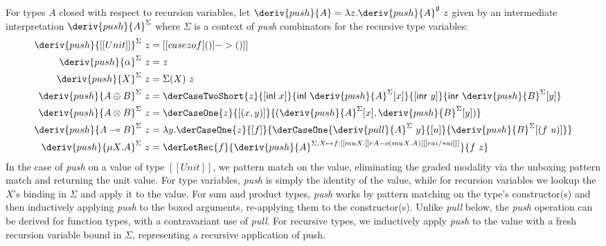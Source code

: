 For types $A$ closed with respect to recursion variables, let $\deriv{push}{A} = \lambda z
. \deriv{push}{A}^\emptyset\ z$ given by an intermediate
interpretation $\deriv{push}{A}^\Sigma$ where $\Sigma$ is a context of \textit{push} combinators for the
recursive type variables:
%
\begin{align*}
\deriv{push}{[[ Unit ]]}^\Sigma \ z & = [[ case z of [ () ] -> () ]]
\\
\deriv{push}{\alpha}^\Sigma       \ z & = z
  \\
  \deriv{push}{X}^\Sigma     \ z & = \Sigma(X)\ z
\\
\deriv{push}{A \oplus B}^\Sigma \ z & =
\derCaseTwoShort{z}{[\mathsf{inl}\ x]}{\mathsf{inl}\ \deriv{push}{A}^{\Sigma}[x]}{[\mathsf{inr}\ y]}
                            {\mathsf{inr}\
                                      \deriv{push}{B}^{\Sigma}[y]}
\\
\deriv{push}{A \otimes B}^\Sigma \ z & =
\derCaseOne{z}{[(x, y)]}
   {(\deriv{push}{A}^{\Sigma}[x], \deriv{push}{B}^{\Sigma}[y])}
\\
  \deriv{push}{A \multimap B}^\Sigma \ z & =
                                \lambda y .
                                \derCaseOne{z}{[f]}{\derCaseOne{\deriv{pull}{A}^{\Sigma}\
                                    y}{[u]}{\deriv{push}{B}^{\Sigma}[(f
                                \ u)]}}
\\
\deriv{push}{\mu X . A}^\Sigma \ z & =
 \derLetRec{f}{\deriv{push}{A}^{\Sigma, X \mapsto
f : [[ {mu X . {[] r A}} -o {{(mu X . A)} [ [] r ai /* ai ]} ]] }}{f\ z}
\end{align*}
%
In the case of \emph{push} on a value of type $[[ Unit ]]$, we pattern match on the value, eliminating the graded modality via the unboxing pattern match and returning the unit value. For type variables, \emph{push} is simply the identity of the value, while for recursion variables we lookup the $X$'s binding in $\Sigma$ and apply it to the value. For sum and product types, \emph{push} works by pattern matching on the type's constructor(s) and then inductively applying \emph{push} to the boxed arguments, re-applying them to the constructor(s).
Unlike \emph{pull} below, the \emph{push} operation can be derived for function
types, with a contravariant use of \emph{pull}.
For recursive types, we inductively apply \emph{push} to the value
with a fresh recursion variable bound in $\Sigma$, representing a
recursive application of push.

